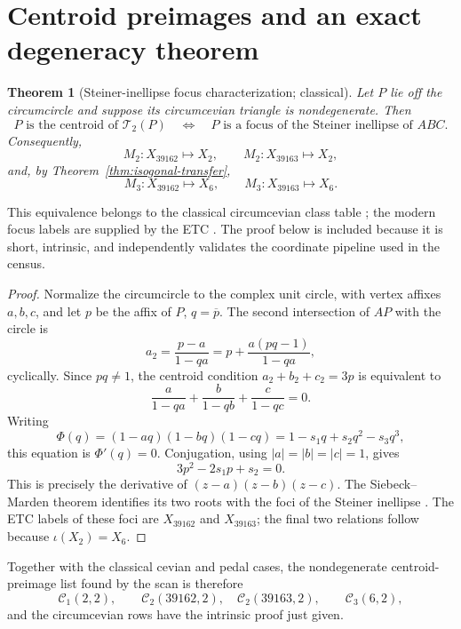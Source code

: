 \documentclass[11pt]{article}
\newtheorem{theorem}{Theorem}
\newcommand{\Circ}{\mathcal T_2}
\begin{document}
\section{Centroid preimages and an exact degeneracy theorem}

\begin{theorem}[Steiner-inellipse focus characterization; classical]
\label{thm:steiner-foci}
Let $P$ lie off the circumcircle and suppose its circumcevian triangle is
nondegenerate.  Then
\[
 P\text{ is the centroid of }\Circ(P)
 \quad\Longleftrightarrow\quad
 P\text{ is a focus of the Steiner inellipse of }ABC.
\]
Consequently,
\[
 M_2:X_{39162}\mapsto X_2,\qquad
 M_2:X_{39163}\mapsto X_2,
\]
and, by Theorem~\ref{thm:isogonal-transfer},
\[
 M_3:X_{39162}\mapsto X_6,\qquad
 M_3:X_{39163}\mapsto X_6.
\]
\end{theorem}

This equivalence belongs to the classical circumcevian class table
\cite{StothersCircum}; the modern focus labels are supplied by the ETC
\cite{ETC}.  The proof below is
included because it is short, intrinsic, and independently validates the
coordinate pipeline used in the census.

\begin{proof}
Normalize the circumcircle to the complex unit circle, with vertex affixes
$a,b,c$, and let $p$ be the affix of $P$, $q=\overline p$.  The second
intersection of $AP$ with the circle is
\[
 a_2=\frac{p-a}{1-qa}
 =p+\frac{a(pq-1)}{1-qa},
\]
cyclically.  Since $pq\ne1$, the centroid condition
$a_2+b_2+c_2=3p$ is equivalent to
\[
 \frac{a}{1-qa}+\frac{b}{1-qb}+\frac{c}{1-qc}=0.
\]
Writing
\[
 \Phi(q)=(1-aq)(1-bq)(1-cq)
 =1-s_1q+s_2q^2-s_3q^3,
\]
this equation is $\Phi'(q)=0$.  Conjugation, using
$|a|=|b|=|c|=1$, gives
\[
 3p^2-2s_1p+s_2=0.
\]
This is precisely the derivative of
$(z-a)(z-b)(z-c)$.  The Siebeck--Marden theorem identifies its two roots
with the foci of the Steiner inellipse \cite{Marden,Kalman}.  The ETC labels
of these foci are $X_{39162}$ and $X_{39163}$; the final two relations follow
because $\iota(X_2)=X_6$.
\end{proof}

Together with the classical cevian and pedal cases, the nondegenerate
centroid-preimage list found by the scan is therefore
\[
 \mathcal C_1(2,2),\qquad
 \mathcal C_2(39162,2),\quad \mathcal C_2(39163,2),\qquad
 \mathcal C_3(6,2),
\]
and the circumcevian rows have the intrinsic proof just given.
\end{document}
